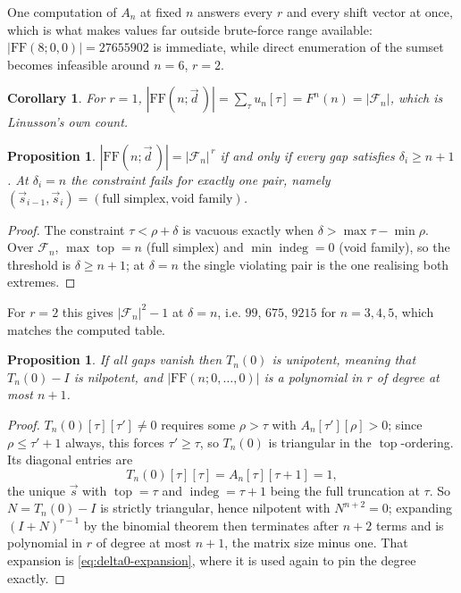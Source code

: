 \documentclass[11pt, a4paper, abstract=yes]{scrartcl}
\theoremstyle{definition}
\theoremstyle{remark}
\theoremstyle{plain}
\newtheorem{proposition}[definition]{Proposition}
\newtheorem{corollary}[definition]{Corollary}
\newcommand{\indeg}{\operatorname{indeg}}
\newcommand{\tp}{\operatorname{top}}
\begin{document}
One computation of \(A_n\) at fixed \(n\) answers every \(r\) and every shift vector at once, which
is what makes values far outside brute-force range available: \(|\mathrm{FF}(8;0,0)|=27655902\) is immediate, while direct enumeration of the sumset
becomes infeasible around \(n=6\), \(r=2\).

\begin{corollary}
For \(r=1\), \(|\mathrm{FF}(n;\vec d\,)|=\sum_\tau u_n[\tau]=F^n(n)=|\mathcal F_n|\), which is Linusson's own count.
\label{cor-r1}
\end{corollary}

\begin{proposition}
\(|\mathrm{FF}(n;\vec d\,)|=|\mathcal F_n|^{\,r}\) if and only if every gap satisfies \(\delta_i\ge n+1\).
At \(\delta_i=n\) the constraint fails for exactly one pair, namely
\((\vec s_{i-1},\vec s_i)=(\text{full simplex},\text{void family})\).
\label{prop-threshold}
\end{proposition}

\begin{proof}
The constraint \(\tau<\rho+\delta\) is vacuous exactly when \(\delta>\max\tau-\min\rho\). Over
\(\mathcal F_n\), \(\max\tp=n\) (full simplex) and \(\min\indeg=0\) (void family), so the threshold is
\(\delta\ge n+1\); at \(\delta=n\) the single violating pair is the one realising both extremes.
\end{proof}

For \(r=2\) this gives \(|\mathcal F_n|^2-1\) at \(\delta=n\), i.e. \(99\), \(675\), \(9215\) for
\(n=3,4,5\), which matches the computed table.

\begin{proposition}
If all gaps vanish then \(T_n(0)\) is unipotent, meaning that \(T_n(0)-I\) is nilpotent, and
\(|\mathrm{FF}(n;0,\dots,0)|\) is a polynomial in
\(r\) of degree at most \(n+1\).
\label{prop-delta0}
\end{proposition}

\begin{proof}
\(T_n(0)[\tau][\tau']\ne0\) requires some \(\rho>\tau\) with \(A_n[\tau'][\rho]>0\); since
\(\rho\le\tau'+1\) always, this forces \(\tau'\ge\tau\), so \(T_n(0)\) is triangular in the
\(\tp\)-ordering. Its diagonal entries are
\[
  T_n(0)[\tau][\tau]=A_n[\tau][\tau+1]=1 ,
\]
the unique
\(\vec s\) with \(\tp=\tau\) and \(\indeg=\tau+1\) being the full truncation at \(\tau\). So
\(N=T_n(0)-I\) is strictly triangular, hence nilpotent with \(N^{n+2}=0\); expanding
\((I+N)^{r-1}\) by the binomial theorem then terminates after \(n+2\) terms and is polynomial in
\(r\) of degree at most \(n+1\), the matrix size minus one. That expansion is
\eqref{eq:delta0-expansion}, where it is used again to pin the degree exactly.
\end{proof}
\end{document}

